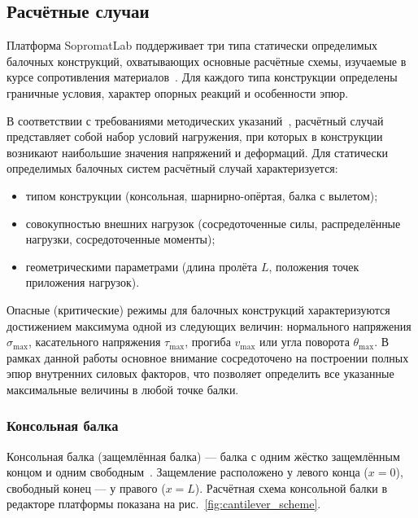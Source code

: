 ﻿%
\subsection{Расчётные случаи}

Платформа SopromatLab поддерживает три типа статически определимых балочных конструкций, охватывающих основные расчётные схемы, изучаемые в курсе сопротивления материалов~\cite{feodosev, aleksandrov}. Для каждого типа конструкции определены граничные условия, характер опорных реакций и особенности эпюр.

В соответствии с требованиями методических указаний~\cite{feodosev, aleksandrov}, расчётный случай представляет собой набор условий нагружения, при которых в конструкции возникают наибольшие значения напряжений и деформаций. Для статически определимых балочных систем расчётный случай характеризуется:
\begin{itemize}
  \item типом конструкции (консольная, шарнирно-опёртая, балка с вылетом);
  \item совокупностью внешних нагрузок (сосредоточенные силы, распределённые нагрузки, сосредоточенные моменты);
  \item геометрическими параметрами (длина пролёта $L$, положения точек приложения нагрузок).
\end{itemize}

Опасные (критические) режимы для балочных конструкций характеризуются достижением максимума одной из следующих величин: нормального напряжения $\sigma_{\max}$, касательного напряжения $\tau_{\max}$, прогиба $v_{\max}$ или угла поворота $\theta_{\max}$. В рамках данной работы основное внимание сосредоточено на построении полных эпюр внутренних силовых факторов, что позволяет определить все указанные максимальные величины в любой точке балки.

\subsubsection{Консольная балка}

Консольная балка (защемлённая балка) --- балка с одним жёстко защемлённым концом и одним свободным~\cite{belyaev}. Защемление расположено у левого конца ($x = 0$), свободный конец --- у правого ($x = L$). Расчётная схема консольной балки в редакторе платформы показана на рис.~\ref{fig:cantilever_scheme}.

